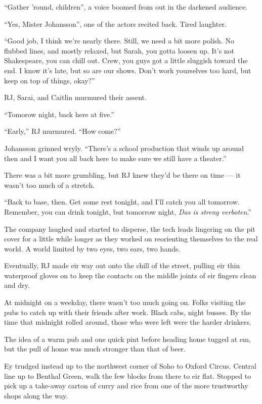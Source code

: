 ``Gather 'round, children'', a voice boomed from out in the darkened audience.

``Yes, Mister Johansson'', one of the actors recited back. Tired laughter.

``Good job, I think we're nearly there. Still, we need a bit more polish. No flubbed lines, and mostly relaxed, but Sarah, you gotta loosen up. It's not Shakespeare, you can chill out. Crew, you guys got a little sluggish toward the end. I know it's late, but so are our shows. Don't work yourselves too hard, but keep on top of things, okay?''

RJ, Sarai, and Caitlin murmured their assent.

``Tomorow night, back here at five.''

``Early,'' RJ murmured. ``How come?''

Johansson grinned wryly. ``There's a school production that winds up around then and I want you all back here to make sure we still have a theater.''

There was a bit more grumbling, but RJ knew they'd be there on time --- it wasn't too much of a stretch.

``Back to base, then. Get some rest tonight, and I'll catch you all tomorrow. Remember, you can drink tonight, but tomorrow night, \emph{Das is streng verboten}.''

The company laughed and started to disperse, the tech leads lingering on the pit cover for a little while longer as they worked on reorienting themselves to the real world. A world limited by two eyes, two ears, two hands.

Eventually, RJ made eir way out onto the chill of the street, pulling eir thin waterproof gloves on to keep the contacts on the middle joints of eir fingers clean and dry.

At midnight on a weekday, there wasn't too much going on. Folks visiting the pubs to catch up with their friends after work. Black cabs, night busses. By the time that midnight rolled around, those who were left were the harder drinkers.

The idea of a warm pub and one quick pint before heading home tugged at em, but the pull of home was much stronger than that of beer.

Ey trudged instead up to the northwest corner of Soho to Oxford Circus. Central line up to Benthal Green, walk the few blocks from there to eir flat. Stopped to pick up a take-away carton of curry and rice from one of the more trustworthy shops along the way.

